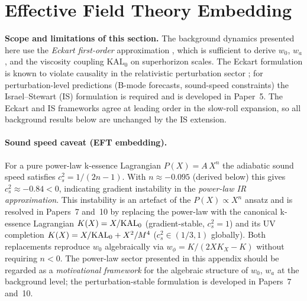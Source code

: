 
\section{Effective Field Theory Embedding}
\label{sec:eft}

\textbf{Scope and limitations of this section.}
The background dynamics presented here use the \emph{Eckart first-order}
approximation \citep{Eckart1940}, which is sufficient to derive $w_0$, $w_a$,
and the viscosity coupling $\mathrm{KAL}_0$ on superhorizon scales.
The Eckart formulation is known to violate causality in the relativistic
perturbation sector \citep{Muller1967,HiscockLindblom1983,HiscockLindblom1985}; for perturbation-level predictions
(B-mode forecasts, sound-speed constraints) the Israel--Stewart (IS) formulation
is required and is developed in Paper~5.
The Eckart and IS frameworks agree at leading order in the slow-roll expansion,
so all background results below are unchanged by the IS extension.

\paragraph{Sound speed caveat (EFT embedding).}
For a pure power-law k-essence Lagrangian $P(X)=A\,X^n$ the adiabatic
sound speed satisfies $c_s^2 = 1/(2n-1)$.  With $n\approx-0.095$ (derived below)
this gives $c_s^2\approx-0.84<0$, indicating gradient instability in the
\emph{power-law IR approximation}.  This instability is an artefact of the
$P(X)\propto X^n$ ansatz and is resolved in Papers~7 and~10 by replacing the
power-law with the canonical k-essence Lagrangian \citep{ArmendarizPicon2001}
$K(X)=X/\mathrm{KAL}_0$ (gradient-stable, $c_s^2=1$) and its UV completion
$K(X)=X/\mathrm{KAL}_0 + X^2/M^4$ ($c_s^2\in(1/3,1)$ globally).
Both replacements reproduce $w_0$ algebraically via $w_\phi = K/(2XK_X-K)$
without requiring $n<0$.
The power-law sector presented in this appendix should be regarded as a
\emph{motivational framework} for the algebraic structure of $w_0$, $w_a$
at the background level; the perturbation-stable formulation is developed
in Papers~7 and~10.

